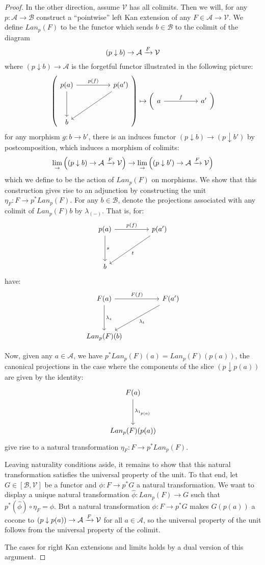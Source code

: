 \begin{thm}
\begin{proof}
      In the other direction, assume $\mathcal{V}$ has all colimits. Then we will, for any $p : \mathcal{A} \to \mathcal{B}$ construct a ``pointwise'' left Kan extension of any $F \in \mathcal{A} \to \mathcal{V}$. We define $Lan_p(F)$ to be the functor which sends $b \in \mathcal{B}$ to the colimit of the diagram
      \[
        (p \downarrow b) \to \mathcal{A} \xrightarrow{F} \mathcal{V}
      \]
      where $(p \downarrow b) \to \mathcal{A}$ is the forgetful functor illustrated in the following picture:
      \[
        \left (
          \ti
        p(a) \ar[d] \ar[r, "p(f)"] & p(a')  \ar[ld] \\
        b
        \kz
      \right ) \mapsto \left(
        \ti a \ar[r, "f"] & a'
        \kz
        \right )
      \]
      for any morphism $g : b \to b'$, there is an induces functor $(p \downarrow b) \to (p \downarrow b')$ by postcomposition, which induces a morphism of colimits:
      \[
        \lim_\to\left ((p \downarrow b) \to \mathcal{A} \xrightarrow{F} \mathcal{V} \right ) \to \lim_\to \left ((p \downarrow b') \to \mathcal{A} \xrightarrow{F} \mathcal{V} \right )
      \]
      which we define to be the action of $Lan_p(F)$ on morphisms. We show that this construction gives rise to an adjunction by constructing the unit $\eta_F : F \to p^*Lan_p(F)$. For any $b \in \mathcal{B}$, denote the projections associated with any colimit of $Lan_p(F)b$ by $\lambda_{(-)}$. That is, for:
      \[
        \ti
        p(a) \ar[d, "s"] \ar[r, "p(f)"] & p(a')  \ar[ld, "t"] \\
        b
        \kz
      \]
      have:
      \[
        \ti
        F(a) \ar[d, "\lambda_s"] \ar[r, "F(f)"] & F(a') \ar[dl, "\lambda_t"] \\
        Lan_p(F)(b)
        \kz
      \]
      
      Now, given any $a \in \mathcal{A}$, we have $p^*Lan_p(F)(a) = Lan_p(F)(p(a))$, the canonical projections in the case where the components of the slice $(p \downarrow p(a))$ are given by the identity:
      \[
        \ti
          F(a) \ar[d, "\lambda_{1_{p(a)}}"]\\
        Lan_p(F)(p(a))
        \kz
      \]
      give rise to a natural transformation $\eta_F : F \to p^*Lan_p(F)$.

      Leaving naturality conditions aside, it remains to show that this natural transformation satisfies the universal property of the unit. To that end, let $G \in [\mathcal{B}, \mathcal{V}]$ be a functor and $\phi : F \to p^*G$ a natural transformation. We want to display a unique natural transformation $\hat \phi : Lan_p(F) \to G$ such that $p^*(\hat \phi) \circ \eta_F = \phi$. But a natural transformation $\phi : F \to p^*G$ makes $G(p(a))$ a cocone to $(p \downarrow p(a)) \to \mathcal{A} \xrightarrow{F} \mathcal{V}$ for all $a \in \mathcal{A}$, so the universal property of the unit follows from the universal property of the colimit.

      The cases for right Kan extensions and limits holds by a dual version of this argument.
    \end{proof}
  \end{thm}
